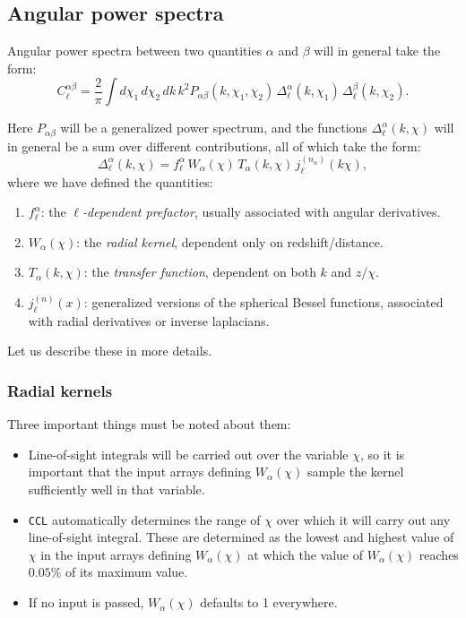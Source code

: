 \documentclass[\docopts]{\docclass}
\begin{document}
\subsection{Angular power spectra}
\label{sec:cl}

Angular power spectra between two quantities $\alpha$ and $\beta$ will in general take the form:
\begin{equation}
  C^{\alpha\beta}_\ell=\frac{2}{\pi}\int d\chi_1\,d\chi_2\,dk\,k^2 P_{\alpha\beta}(k,\chi_1,\chi_2)\,\Delta^\alpha_\ell(k,\chi_1)\,\Delta^\beta_\ell(k,\chi_2).
\end{equation}

Here $P_{\alpha\beta}$ will be a generalized power spectrum, and the functions $\Delta^\alpha_\ell(k,\chi)$ will in general be a sum over
different contributions, all of which take the form:
\begin{equation}\label{eq:generalized_tracer}
  \Delta^\alpha_\ell(k,\chi)=f^\alpha_\ell\,W_\alpha(\chi)\,T_\alpha(k,\chi)\,j^{(n_\alpha)}_\ell(k\chi),
\end{equation}
where we have defined the quantities:
\begin{enumerate}
 \item $f^\alpha_\ell$: the \emph{$\ell$-dependent prefactor}, usually associated with angular derivatives.
 \item $W_\alpha(\chi)$: the \emph{radial kernel}, dependent only on redshift/distance.
 \item $T_\alpha(k,\chi)$: the \emph{transfer function}, dependent on both $k$ and $z/\chi$.
 \item $j^{(n)}_\ell(x)$: generalized versions of the spherical Bessel functions, associated with radial derivatives or inverse laplacians.
\end{enumerate}
Let us describe these in more details.

\subsubsection*{Radial kernels}
Three important things must be noted about them:
\begin{itemize}
 \item Line-of-sight integrals will be carried out over the variable $\chi$, so it is important that the input arrays defining $W_\alpha(\chi)$ sample the kernel sufficiently well in that variable.
 \item {\tt CCL} automatically determines the range of $\chi$ over which it will carry out any line-of-sight integral. These are determined as the lowest and highest value of $\chi$ in the input arrays defining $W_\alpha(\chi)$ at which the value of $W_\alpha(\chi)$ reaches $0.05\%$ of its maximum value.
 \item If no input is passed, $W_\alpha(\chi)$ defaults to 1 everywhere.
\end{itemize}
\end{document}

